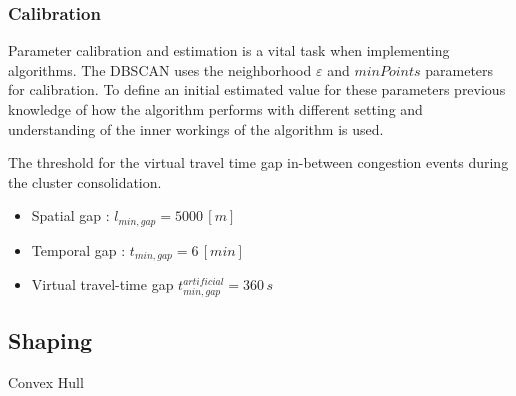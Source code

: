 \documentclass[a4paper,headsepline,footsepline,fontsize=11pt,BCOR=12mm,DIV=12]{report}
\begin{document}

\subsubsection{Calibration}
Parameter calibration and estimation is a vital task when implementing algorithms. The DBSCAN uses the neighborhood $\varepsilon$ and $minPoints$ parameters for calibration. To define an initial estimated value for these parameters previous knowledge of how the algorithm performs with different setting and understanding of the inner workings of the algorithm is used.


The threshold for the virtual travel time gap in-between congestion events during the cluster consolidation. 
\begin{itemize}
	\item Spatial gap : $l_{min,gap} = 5000 \, [m]$ %
	\item Temporal gap : $t_{min,gap} = 6 \, [min]$ %
	\item Virtual travel-time gap $t_{min,gap}^{artificial} = 360 \, s$
\end{itemize}


\subsection{Shaping}
\label{methodology_shaping}

Convex Hull
\begin{figure}[h]
	\centering
\end{figure}
\end{document}
